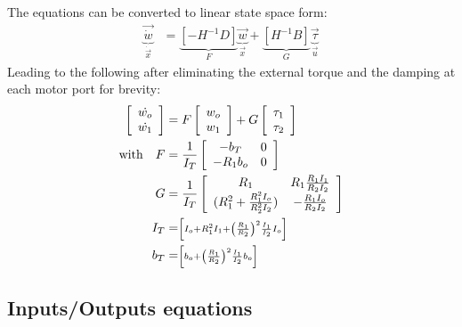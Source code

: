 %
The equations can be converted to linear state space form:
\begin{align}
\underbrace{ \vec{\dot{w}} }_{\dot{\vec{x}}}
 &= 
\underbrace{ \left[ -H^{-1} D \right] }_{F}
\underbrace{ \vec{w} }_{\vec{x}}
+ 
\underbrace{ \left[ H^{-1} B \right] }_{G}
\underbrace{ \vec{\tau} }_{\vec{u}}
\label{eq:ss_full}
\end{align}
%
Leading to the following after eliminating the external torque and the damping at each motor port for brevity:
\begin{align}
\left[
\begin{array}{c}
\dot{w_o}\\
\dot{w_1}
\end{array}
\right] &= 
F
\left[ \begin{array}{c}
w_o \\
w_1
\end{array} \right]+
G
\left[ \begin{array}{c}
\tau_1 \\
\tau_2
\end{array} \right] 
\label{eq:ss}
\\
\text{with} \quad 
F &=
\frac{1}{I_T}
\left[
\begin{array}{c c}
-b_T      &  0 \\
-R_1 b_o  &  0 \\
\end{array}
\right] \\
G &= 
\frac{1}{I_T}
\left[
\begin{array}{c c}
 R_1  &   R_1 \frac{R_1 I_1}{R_2 I_2}  \\
(R_1^2+\frac{R_1^2 I_o}{R_2^2 I_2})  &  - \frac{R_1 I_o}{R_2 I_2} \\
\end{array}
\right] \\
 I_T &=  \scriptstyle \left[   I_o + R_1^2 I_1 + \left( \frac{R_1}{R_2} \right)^2 \frac{I_1}{I_2} I_o \right]\\
 b_T &= \scriptstyle \left[ b_o + \left( \frac{R_1}{R_2} \right)^2 \frac{I_1}{I_2} b_o \right] 
\end{align}
%


\subsection{Inputs/Outputs equations}
\label{sec:out}

